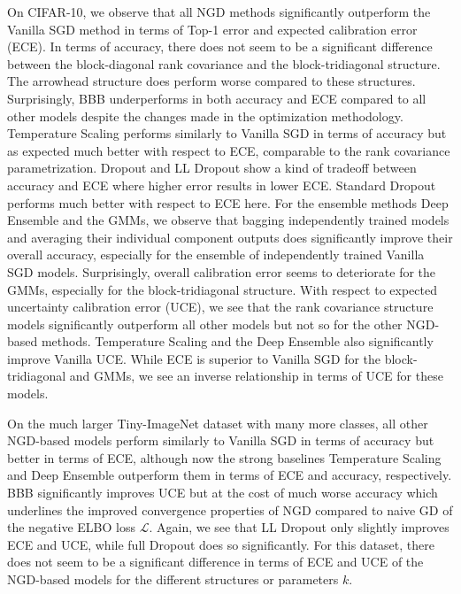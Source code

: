 \documentclass[a4paper, 11pt, oneside]{scrartcl}
\theoremstyle{break}
\numberwithin{equation}{section}
\begin{document}
		On CIFAR-10, we observe that all NGD methods significantly outperform the Vanilla SGD method in terms of Top-1 error and expected calibration error (ECE). 
		In terms of accuracy, there does not seem to be a significant difference between the block-diagonal rank covariance and the block-tridiagonal structure. 
		The arrowhead structure does perform worse compared to these structures.
		Surprisingly, BBB underperforms in both accuracy and ECE compared to all other models despite the changes made in the optimization methodology.  
		Temperature Scaling performs similarly to Vanilla SGD in terms of accuracy but as expected much better with respect to ECE, comparable to the rank covariance parametrization.
		Dropout and LL Dropout show a kind of tradeoff between accuracy and ECE where higher error results in lower ECE. 
		Standard Dropout performs much better with respect to ECE here. 
		For the ensemble methods Deep Ensemble and the GMMs, we observe that bagging independently trained models and averaging their individual component outputs does significantly improve their overall accuracy, especially for the ensemble of independently trained Vanilla SGD models.
		Surprisingly, overall calibration error seems to deteriorate for the GMMs, especially for the block-tridiagonal structure. 
		With respect to expected uncertainty calibration error (UCE), we see that the rank covariance structure models significantly outperform all other models but not so for the other NGD-based methods. 
		Temperature Scaling and the Deep Ensemble also significantly improve Vanilla UCE. 
		While ECE is superior to Vanilla SGD for the block-tridiagonal and GMMs, we see an inverse relationship in terms of UCE for these models. 

		On the much larger Tiny-ImageNet dataset with many more classes, all other NGD-based models perform similarly to Vanilla SGD in terms of accuracy but better in terms of ECE, although now the strong baselines Temperature Scaling and Deep Ensemble outperform them in terms of ECE and accuracy, respectively. 
		BBB significantly improves UCE but at the cost of much worse accuracy which underlines the improved convergence properties of NGD compared to naive GD of the negative ELBO loss $\mathcal{L}$. 
		Again, we see that LL Dropout only slightly improves ECE and UCE, while full Dropout does so significantly.
		For this dataset, there does not seem to be a significant difference in terms of ECE and UCE of the NGD-based models for the different structures or parameters $k$.
\end{document}
